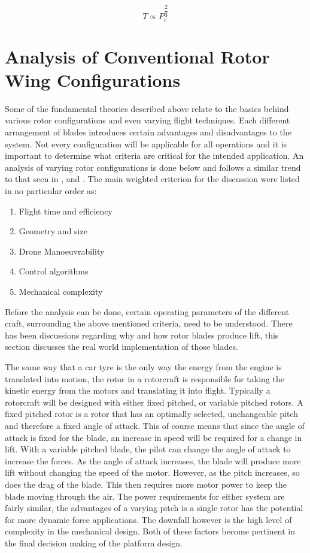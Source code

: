 	\begin{equation*}
	T \propto P_e^{\dfrac{2}{3}}
	\end{equation*}

\section{Analysis of Conventional Rotor Wing Configurations}\label{SECT_RotorConfig}

Some of the fundamental theories described above relate to the basics behind various rotor configurations and even varying flight techniques. Each different arrangement of blades introduces certain advantages and disadvantages to the system. Not every configuration will be applicable for all operations and it is important to determine what criteria are critical for the intended application.  An analysis of varying rotor configurations is done below and follows a similar trend to that seen in \cite{RotorConfig}, \cite{Bohorquez} and \cite{NewMAV}. The main weighted criterion for the discussion were listed in no particular order as:

\begin{enumerate}
	\item Flight time and efficiency
	\item Geometry and size
	\item Drone Manoeuvrability
	\item Control algorithms
	\item Mechanical complexity
\end{enumerate}

Before the analysis can be done, certain operating parameters of the different craft, surrounding the above mentioned criteria, need to be understood. There has been discussions regarding why and how rotor blades produce lift, this section discusses the real world implementation of those blades.


The same way that a car tyre is the only way the energy from the engine is translated into motion, the rotor in a rotorcraft is responsible for taking the kinetic energy from the motors and translating it into flight. Typically a rotorcraft will be designed with either fixed pitched, or variable pitched rotors. A fixed pitched rotor is a rotor that has an optimally selected, unchangeable pitch and therefore a fixed angle of attack. This of course means that since the angle of attack is fixed for the blade, an increase in speed will be required for a change in lift. With a variable pitched blade, the pilot can change the angle of attack to increase the forces. As the angle of attack increases, the blade will produce more lift without changing the speed of the motor. However, as the pitch increases, so does the drag of the blade. This then requires more motor power to keep the blade moving through the air.
The power requirements for either system are fairly similar, the advantages of a varying pitch is a single rotor has the potential for more dynamic force applications. The downfall however is the high level of complexity in the mechanical design. Both of these factors become pertinent in the final decision making of the platform design.

